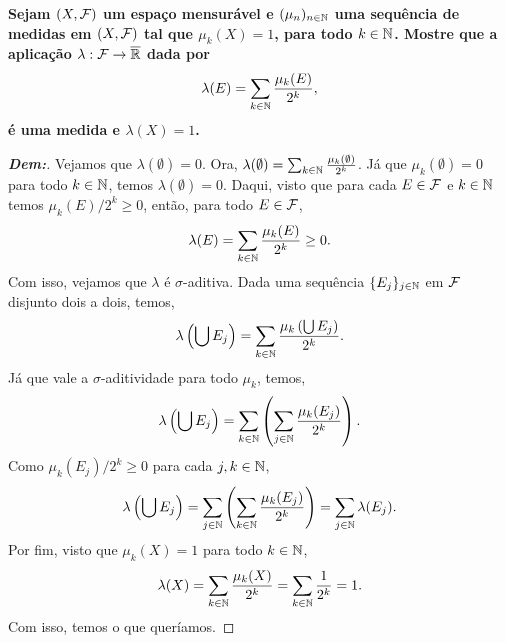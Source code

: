 \biglinend
\newpage 
{}
\myexe{\thedois}
\bigline 
\textbf{
  Sejam $(X, \mathcal F)$ um espaço mensurável e $(\mu_n)_{n \in \mathbb N}$ uma sequência 
  de medidas em $(X, \mathcal F)$ tal que $\mu_k(X) = 1$, para todo $k \in \mathbb N$. 
  Mostre que a aplicação $\lambda: \mathcal F \rightarrow \overline {\mathbb R}$ dada por 
\begin{align*}
  \lambda(E) = \sum_{k \in \mathbb N} \frac{\mu_k(E)}{2^k},
\end{align*}
é uma medida e $\lambda(X) = 1$.
}
\begin{proof}[\textbf{Dem:}] Vejamos que $\lambda(\emptyset) = 0$. 
Ora, $\lambda(\emptyset) = \sum_{k \in \mathbb N} \frac{\mu_k(\emptyset)}{2^k}$. Já que 
  $\mu_k(\emptyset) = 0$ para todo $k \in \mathbb N$, temos $\lambda(\emptyset) = 0$.
  Daqui, visto que para cada $E \in \mathcal F$ e $k \in \mathbb N$ temos $\mu_k(E)/2^k \ge 0$, 
então, para todo $E \in \mathcal F$,
  \begin{align*}
    \lambda(E) = \sum_{k \in \mathbb N} \frac{\mu_k(E)}{2^k} \ge 0.
  \end{align*}
  Com isso, vejamos que $\lambda$ é $\sigma$-aditiva. Dada uma sequência 
  $\{E_j\}_{j \in \mathbb N}$ em $\mathcal F$ disjunto dois a dois, temos, 
  \begin{align*}
    \lambda\left(\bigcup E_j\right) = 
    \sum_{k \in \mathbb N} \frac{\mu_k \left(\bigcup E_j\right)}{2^k}.
  \end{align*}
  Já que vale a $\sigma$-aditividade para todo $\mu_k$, temos,
  \begin{align*}
    \lambda\left(\bigcup E_j\right) = 
    \sum_{k \in \mathbb N}\left(\sum_{j \in \mathbb N} \frac{\mu_k (E_j)}{2^k} \right).
  \end{align*}
  Como $\mu_k(E_j)/2^k \ge 0$ para cada $j,k \in \mathbb N$,
 \begin{align*}
    \lambda\left(\bigcup E_j\right) = 
    \sum_{j \in \mathbb N}\left(\sum_{k \in \mathbb N} \frac{\mu_k (E_j)}{2^k} \right) = 
    \sum_{j \in \mathbb N}\lambda(E_j).
  \end{align*}
 Por fim, visto que $\mu_k(X) = 1$ para todo $k \in \mathbb N$, 
\begin{align*}
  \lambda(X) = \sum_{k \in \mathbb N} \frac{\mu_k(X)}{2^k} 
  = \sum_{k \in \mathbb N} \frac{1}{2^k} = 1. 
\end{align*}
Com isso, temos o que queríamos.
\end{proof}

